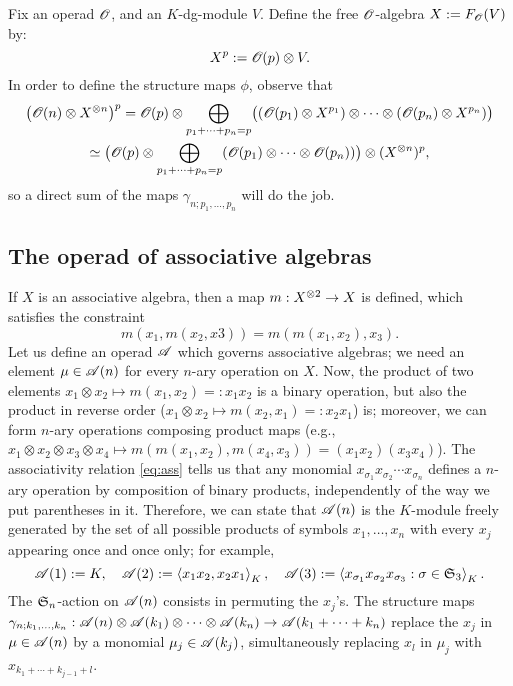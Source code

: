 \begin{example} Fix an operad ${\mathscr{O}_{}}$, and an
  $K$-dg-module $V$. Define the free ${\mathscr{O}_{}}$-algebra $X := F_{\mathscr{O}_{}}(V)$ by:
  \begin{equation*}
    X^p := {\mathscr{O}_{}}(p) \otimes V.
  \end{equation*}
  In order to define the structure maps $\phi$, observe that 
  \begin{multline*}
    \bigl( {\mathscr{O}_{}}(n) \otimes X\sp{\otimes n} \bigr)^p = {\mathscr{O}_{}}(p) \otimes \bigoplus_{p_1 + \cdots + p_n =
      p} \bigl( ({\mathscr{O}_{}}(p_1) \otimes X^{p_1}) \otimes \cdots \otimes ({\mathscr{O}_{}}(p_n) \otimes X^{p_n})
    \bigr) 
    \\
    \simeq \bigl( {\mathscr{O}_{}}(p) \otimes \bigoplus_{p_1 + \cdots + p_n =
      p} ({\mathscr{O}_{}}(p_1) \otimes \cdots \otimes {\mathscr{O}_{}}(p_n)) \bigr) \otimes (X\sp{\otimes n})^p,
  \end{multline*}
  so a direct sum of the maps $\gamma_{n; p_1, \ldots, p_n}$ will do the job.
\end{example}


\subsection{The operad of associative algebras}
\label{sec:operad-assoc}
If $X$ is an associative algebra, then a map $m: X\sp{\otimes 2} \to X$ is
defined, which satisfies the constraint
\begin{equation}
  \label{eq:ass}
  m(x_1, m(x_2, x3)) = m(m(x_1, x_2), x_3).
\end{equation}
Let us define an operad $\mathscr{A}$ which governs associative algebras; we
need an element $\mu \in \mathscr{A}(n)$ for every $n$-ary operation on $X$. Now,
the product of two elements $x_1 \otimes x_2 \mapsto m(x_1, x_2) =: x_1x_2$ is a
binary operation, but also the product in reverse order ($x_1 \otimes x_2
\mapsto m(x_2, x_1) =: x_2x_1$) is; moreover, we can form $n$-ary
operations composing product maps (e.g., $x_1 \otimes x_2 \otimes x_3 \otimes x_4 \mapsto
m(m(x_1, x_2), m(x_4, x_3)) = (x_1x_2)(x_3x_4)$).  The associativity
relation \eqref{eq:ass} tells us that any monomial $x_{\sigma_1} x_{\sigma_2}
\cdots x_{\sigma_n}$ defines a $n$-ary operation by composition of binary
products, independently of the way we put parentheses in it.
Therefore, we can state that $\mathscr{A}(n)$ is the $K$-module freely
generated by the set of all possible products of symbols $x_1, \ldots,
x_n$ with every $x_j$ appearing once and once only; for example,
\begin{equation*}
  \mathscr{A}(1) := K,
  \quad \mathscr{A}(2) := \left\langle x_1x_2, x_2x_1\right\rangle_K, 
  \quad \mathscr{A}(3) := \left\langle x_{\sigma_1}x_{\sigma_2}x_{\sigma_3} : \sigma \in \mathfrak{S}_{3}\right\rangle_K.
\end{equation*}
The $\mathfrak{S}_{n}$-action on $\mathscr{A}(n)$ consists in permuting the $x_j$'s.
The structure maps $\gamma_{n; k_1, \ldots, k_n}: \mathscr{A}(n) \otimes \mathscr{A}(k_1) \otimes \cdots \otimes
\mathscr{A}(k_n) \to \mathscr{A}(k_1 + \cdots + k_n)$ replace the $x_j$ in $\mu \in \mathscr{A}(n)$ by a
monomial $\mu_j \in \mathscr{A}(k_j)$, simultaneously replacing $x_l$ in $\mu_j$
with $x_{k_1 + \cdots + k_{j-1} + l}$.
  

